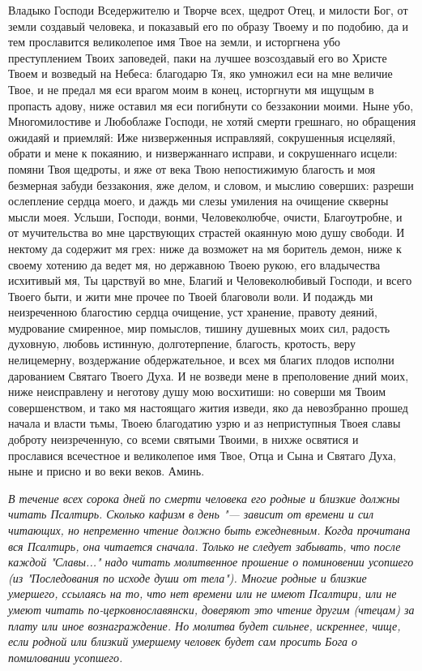    Владыко Господи Вседержителю и Творче всех, щедрот Отец, и
милости Бог, от земли создавый человека, и показавый его по образу
Твоему и по подобию, да и тем прославится великолепое имя Твое
на земли, и исторгнена убо преступлением Твоих заповедей, паки
на лучшее возсоздавый его во Христе Твоем и возведый на Небеса:
благодарю Тя, яко умножил еси на мне величие Твое, и не предал
мя еси врагом моим в конец, исторгнути мя ищущым в пропасть
адову, ниже оставил мя еси погибнути со беззаконии моими. Ныне убо,
Многомилостиве и Любоблаже Господи, не хотяй смерти грешнаго, но
обращения ожидаяй и приемляй: Иже низверженныя исправляяй,
сокрушенныя исцеляяй, обрати и мене к покаянию, и низвержаннаго
исправи, и сокрушеннаго исцели: помяни Твоя щедроты, и яже от века Твою
непостижимую благость и моя безмерная забуди беззакония, яже
делом, и словом, и мыслию соверших: разреши ослепление сердца
моего, и даждь ми слезы умиления на очищение скверны мысли моея.
Усльши, Господи, вонми, Человеколюбче, очисти, Благоутробне, и от
мучительства во мне царствующих страстей окаянную мою душу
свободи. И нектому да содержит мя грех: ниже да возможет на мя
боритель демон, ниже к своему хотению да ведет мя, но державною
Твоею рукою, его владычества исхитивый мя, Ты царствуй во мне,
Благий и Человеколюбивый Господи, и всего Твоего быти, и жити
мне прочее по Твоей благоволи воли. И подаждь ми неизреченною
благостию сердца очищение, уст хранение, правоту деяний, мудрование
смиренное, мир помыслов, тишину душевных моих сил, радость духовную,
любовь истинную, долготерпение, благость, кротость, веру нелицемерну,
воздержание обдержательное, и всех мя благих плодов исполни дарованием
Святаго Твоего Духа. И не возведи мене в преполовение дний моих,
ниже неисправлену и неготову душу мою восхитиши: но соверши мя
Твоим совершенством, и тако мя настоящаго жития изведи, яко да
невозбранно прошед начала и власти тьмы, Твоею благодатию узрю и аз
неприступныя Твоея славы доброту неизреченную, со всеми святыми
Твоими, в нихже освятися и прославися всечестное и великолепое имя
Твое, Отца и Сына и Святаго Духа, ныне и присно и во веки веков.
Аминь.


   

\mychapterending

 


\itshape В течение всех сорока дней по смерти человека его родные и близкие должны читать Псалтирь. Сколько кафизм в день "--- зависит от времени и сил читающих, но непременно чтение должно быть ежедневным. Когда прочитана вся Псалтирь, она читается сначала. Только не следует забывать, что после каждой "Славы..." надо читать молитвенное прошение о поминовении усопшего (из "Последования по исходе души от тела"). Многие родные и близкие умершего, ссылаясь на то, что нет времени или не имеют Псалтири, или не умеют читать по-церковнославянски, доверяют это чтение другим (чтецам) за плату или иное вознаграждение. Но молитва будет сильнее, искреннее, чище, если родной или близкий умершему человек будет сам просить Бога о помиловании усопшего. 

